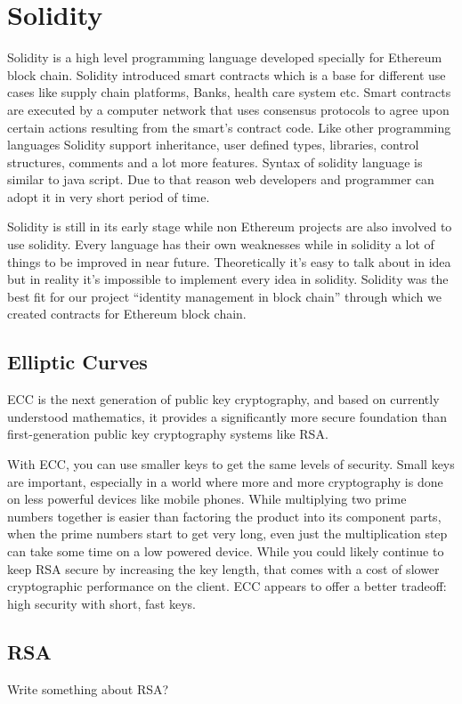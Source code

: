 \section{Solidity}
Solidity is a high level programming language developed specially for Ethereum block chain. Solidity introduced smart contracts which is a base for different use cases like supply chain platforms, Banks, health care system etc. Smart contracts are executed by a computer network that uses consensus protocols to agree upon certain actions resulting from the smart’s contract code. Like other programming languages Solidity support inheritance, user defined types, libraries, control structures, comments and a lot more features. Syntax of solidity language is similar to java script. Due to that reason web developers and programmer can adopt it in very short period of time.

Solidity is still in its early stage while non Ethereum projects are also involved to use solidity. Every language has their own weaknesses while in solidity a lot of things to be improved in near future. Theoretically it’s easy to talk about in idea but in reality it’s impossible to implement every idea in solidity. Solidity was the best fit for our project “identity management in block chain” through which we created contracts for Ethereum block chain.

\subsection{Elliptic Curves}
ECC is the next generation of public key cryptography, and based on currently understood mathematics, it provides a significantly more secure foundation than first-generation public key cryptography systems like RSA.

With ECC, you can use smaller keys to get the same levels of security. Small keys are important, especially in a world where more and more cryptography is done on less powerful devices like mobile phones. While multiplying two prime numbers together is easier than factoring the product into its component parts, when the prime numbers start to get very long, even just the multiplication step can take some time on a low powered device. While you could likely continue to keep RSA secure by increasing the key length, that comes with a cost of slower cryptographic performance on the client. ECC appears to offer a better tradeoff: high security with short, fast keys.

\subsection{RSA}
\begin{notation}
	Write something about RSA?
\end{notation}
